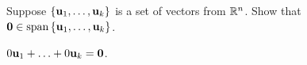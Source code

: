\begin{ex}
  Suppose $\left\{\mbox{\bf u}_{1},\ldots,\mbox{\bf u}_{k}\right\} $ is a set of
  vectors from $\mathbb{R}^{n}$. Show that
  $\vect{0}\in\sspan\set{\vect{u}_{1},\ldots,\vect{u}_{k}}$.
  \begin{sol}
    $0\mbox{\bf u}_1+\ldots+0\mbox{\bf u}_k = \mbox{\bf 0}$.
  \end{sol}
\end{ex}

